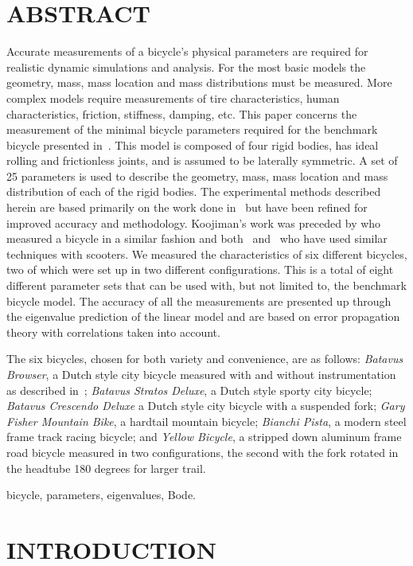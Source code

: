 \documentclass{bmd2010p}
\begin{document}
\section*{ABSTRACT}
Accurate measurements of a bicycle's physical parameters are required for
realistic dynamic simulations and analysis. For the most basic models the
geometry, mass, mass location and mass distributions must be measured. More complex models
require measurements of tire characteristics, human characteristics, friction, stiffness, damping, etc. This
paper concerns the measurement of the minimal bicycle parameters required for
the benchmark bicycle presented in~\cite{Meijaard2007}. This
model is composed of four rigid bodies, has ideal rolling and frictionless joints,
and is assumed to be laterally symmetric. A set of 25
parameters is used to describe the geometry, mass, mass location and
mass distribution of each of the rigid bodies. The experimental methods
described herein are based primarily on the work
done in~\cite{Kooijman2006} but have been refined for improved accuracy and
methodology. Koojiman's work was preceded by \cite{Roland1971} who measured a bicycle in a
similar fashion and both~\cite{Dohring1953} and~\cite{Singh1971} who have used
similar techniques with scooters. We measured the characteristics of six
different bicycles, two of which were set up in two different configurations.
This is a total of eight different parameter sets that can be used with, but not
limited to, the benchmark bicycle model. The accuracy of all the measurements
are presented up through the eigenvalue prediction of the linear model and are
based on error propagation theory with correlations taken into account.

The six bicycles, chosen for both variety and convenience, are as follows:
\emph{Batavus Browser}, a Dutch style city bicycle measured with and without
instrumentation as described in~\cite{Kooijman2009a}; \emph{Batavus Stratos
Deluxe}, a Dutch style sporty city bicycle; \emph{Batavus Crescendo Deluxe} a
Dutch style city bicycle with a suspended fork; \emph{Gary Fisher Mountain
Bike}, a hardtail mountain bicycle; \emph{Bianchi Pista}, a modern steel frame
track racing bicycle; and \emph{Yellow Bicycle}, a stripped down aluminum frame
road bicycle measured in two configurations, the second with the fork rotated
in the headtube 180 degrees for larger trail.
\begin{keywords}
bicycle,
parameters,
eigenvalues,
Bode.
\end{keywords}

\section{INTRODUCTION}
\end{document}
